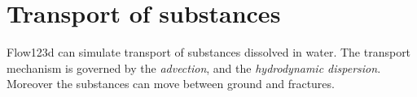 \def\abs#1{\lvert#1\rvert}
\def\argdot{{\hspace{0.18em}\cdot\hspace{0.18em}}}
\def\avg#1{\left\{#1\right\}_\omega}
\def\D{{\tn D}}
\def\div{\operatorname{div}}
\def\Eh{\mathcal E_h}       %
\def\Ehcom{\mathcal E_{h,C}}         %
\def\Ehdir{\mathcal E_{h,D}}         %
\def\Ehint{\mathcal E_{h,I}}       %
\def\grad{\nabla}
\def\jmp#1{[#1]}
\def\n{\vc n}
\def\vc#1{\mathbf{\boldsymbol{#1}}}     %
\def\R{\mathbb R}
\def\sc#1#2{\left(#1,#2\right)}
\def\Th{\mathcal T_h}       %
\def\th{\vartheta}
\def\tn#1{{\mathbb{#1}}}    %
\def\Tr{\operatorname{Tr}}
\def\where{\,|\,}


\section{Transport of substances}

Flow123d can simulate transport of substances dissolved in water.
The transport mechanism is governed by the \emph{advection}, and the \emph{hydrodynamic dispersion}.
Moreover the substances can move between ground and fractures.


